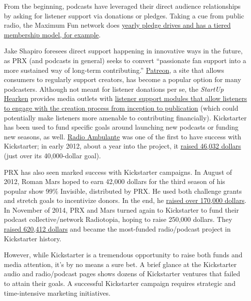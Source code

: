 \documentclass[notoc, symmetric, nobib, nols]{towcenter-guideto-book}
\begin{document}
From the beginning, podcasts have leveraged their direct audience relationships by asking for listener support via donations or pledges. Taking a cue from public radio, the Maximum Fun network does \href{http://www.maximumfun.org/donate}{yearly pledge drives and has a tiered membership model, for example}.

Jake Shapiro foresees direct support happening in innovative ways in the future, as PRX (and podcasts in general) seeks to convert ``passionate fan support into a more sustained way of long-term contributing.''\autocite{shapiro} \href{https://www.patreon.com/}{Patreon}, a site that allows consumers to regularly support creators, has become a popular option for many podcasters. Although not meant for listener donations per se, the \textit{StartUp} \href{http://www.wearehearken.com}{Hearken} provides media outlets with \href{http://knightfoundation.org/blogs/knightblog/2015/7/27/curious-city-inspires-scalable-model-engagement-journalism-answers-peoples-questions/}{listener support modules that allow listeners to engage with the creation process from inception to publication} (which could potentially make listeners more amenable to contributing financially). Kickstarter has been used to fund specific goals around launching new podcasts or funding new seasons, as well. \href{http://radioambulante.org}{Radio Ambulante} was one of the first to have success with Kickstarter; in early 2012, about a year into the project, it \href{https://www.kickstarter.com/projects/1255653356/radio-ambulante/description}{raised 46,032 dollars} (just over its 40,000-dollar goal).\autocite{ambulante}

PRX has also seen marked success with Kickstarter campaigns. In August of 2012, Roman Mars hoped to earn 42,000 dollars for the third season of his popular show 99\% Invisible, distributed by PRX. He used both challenge grants and stretch goals to incentivize donors. In the end, he \href{http://current.org/2012/08/podcast-with-limited-radio-airplay-sets-kickstarter-record/}{raised over 170,000 dollars}.\autocite{mars} In November of 2014, PRX and Mars turned again to Kickstarter to fund their podcast collective/network Radiotopia, hoping to raise 250,000 dollars. They \href{http://knightfoundation.org/blogs/knightblog/2014/11/14/radiotopia-sets-record-for-publishing-and-radio-funding-on-kickstarter/}{raised 620,412 dollars} and became the most-funded radio/podcast project in Kickstarter history.\autocite{radiotopia}

However, while Kickstarter is a tremendous opportunity to raise both funds and media attention, it's by no means a sure bet. A brief glance at the Kickstarter audio and radio/podcast pages shows dozens of Kickstarter ventures that failed to attain their goals. A successful Kickstarter campaign requires strategic and time-intensive marketing initiatives.
\end{document}
